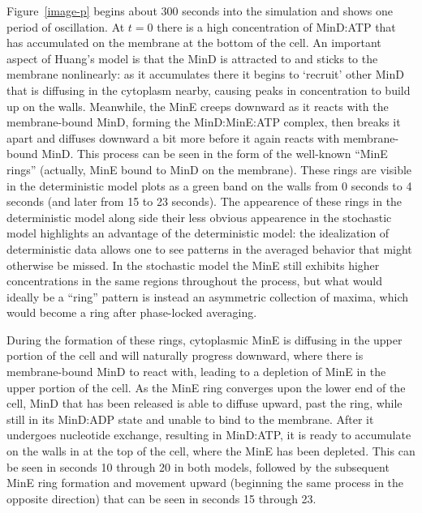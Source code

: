 \documentclass{pnastwo}
\begin{document}
\begin{article}
Figure~\ref{image-p} begins about 300 seconds into the simulation and
shows one period of oscillation.  At $t=0$ there is a high
concentration of MinD:ATP that has accumulated on the membrane at the
bottom of the cell. An important aspect of Huang's model is that the
MinD is attracted to and sticks to the membrane nonlinearly: as it
accumulates there it begins to `recruit' other MinD that is diffusing
in the cytoplasm nearby, causing peaks in concentration to build up on
the walls.  Meanwhile, the MinE creeps downward as it reacts with the
membrane-bound MinD, forming the MinD:MinE:ATP complex, then breaks it
apart and diffuses downward a bit more before it again reacts with
membrane-bound MinD.  This process can be seen in the form of the
well-known ``MinE rings'' (actually, MinE bound to MinD on the
membrane).  These rings are visible in the deterministic model plots
as a green band on the walls from 0 seconds to 4 seconds (and later
from 15 to 23 seconds).  The appearence of these rings in the
deterministic model along side their less obvious appearence in the
stochastic model highlights an advantage of the deterministic model:
the idealization of deterministic data allows one to see patterns in
the averaged behavior that might otherwise be missed.  In the
stochastic model the MinE still exhibits higher concentrations in the
same regions throughout the process, but what would ideally be a
``ring'' pattern is instead an asymmetric collection of maxima, which
would become a ring after phase-locked averaging.

During the formation of these rings, cytoplasmic MinE is diffusing in
the upper portion of the cell and will naturally progress downward,
where there is membrane-bound MinD to react with, leading to a
depletion of MinE in the upper portion of the cell.  As the MinE ring
converges upon the lower end of the cell, MinD that has been released
is able to diffuse upward, past the ring, while still in its MinD:ADP
state and unable to bind to the membrane.  After it undergoes
nucleotide exchange, resulting in MinD:ATP, it is ready to accumulate
on the walls in at the top of the cell, where the MinE has been
depleted.  This can be seen in seconds 10 through 20 in both models,
followed by the subsequent MinE ring formation and movement upward
(beginning the same process in the opposite direction) that can be
seen in seconds 15 through 23.


\end{article}
\end{document}
